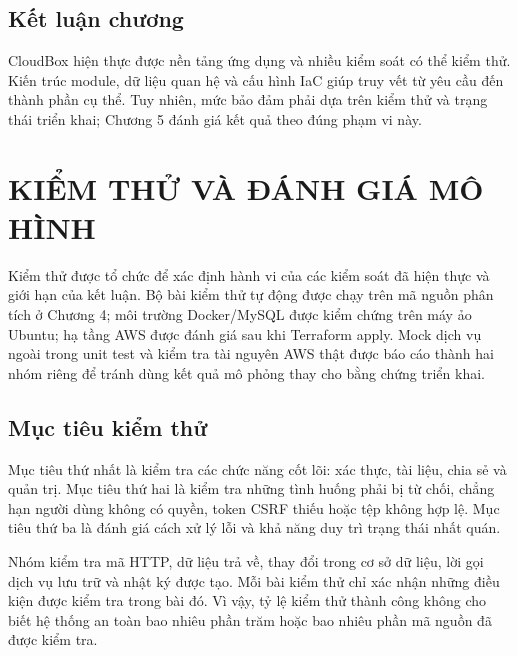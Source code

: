 \section{Kết luận chương}
CloudBox hiện thực được nền tảng ứng dụng và nhiều kiểm soát có thể kiểm thử. Kiến trúc module, dữ liệu quan hệ và cấu hình IaC giúp truy vết từ yêu cầu đến thành phần cụ thể. Tuy nhiên, mức bảo đảm phải dựa trên kiểm thử và trạng thái triển khai; Chương 5 đánh giá kết quả theo đúng phạm vi này.
\chapter{KIỂM THỬ VÀ ĐÁNH GIÁ MÔ HÌNH}
\label{chap:kiemthu}
Kiểm thử được tổ chức để xác định hành vi của các kiểm soát đã hiện thực và giới hạn của kết luận. Bộ bài kiểm thử tự động được chạy trên mã nguồn phân tích ở Chương 4; môi trường Docker/MySQL được kiểm chứng trên máy ảo Ubuntu; hạ tầng AWS được đánh giá sau khi Terraform apply. Mock dịch vụ ngoài trong unit test và kiểm tra tài nguyên AWS thật được báo cáo thành hai nhóm riêng để tránh dùng kết quả mô phỏng thay cho bằng chứng triển khai.

\section{Mục tiêu kiểm thử}
Mục tiêu thứ nhất là kiểm tra các chức năng cốt lõi: xác thực, tài liệu, chia sẻ và quản trị. Mục tiêu thứ hai là kiểm tra những tình huống phải bị từ chối, chẳng hạn người dùng không có quyền, token CSRF thiếu hoặc tệp không hợp lệ. Mục tiêu thứ ba là đánh giá cách xử lý lỗi và khả năng duy trì trạng thái nhất quán.

Nhóm kiểm tra mã HTTP, dữ liệu trả về, thay đổi trong cơ sở dữ liệu, lời gọi dịch vụ lưu trữ và nhật ký được tạo. Mỗi bài kiểm thử chỉ xác nhận những điều kiện được kiểm tra trong bài đó. Vì vậy, tỷ lệ kiểm thử thành công không cho biết hệ thống an toàn bao nhiêu phần trăm hoặc bao nhiêu phần mã nguồn đã được kiểm tra.

